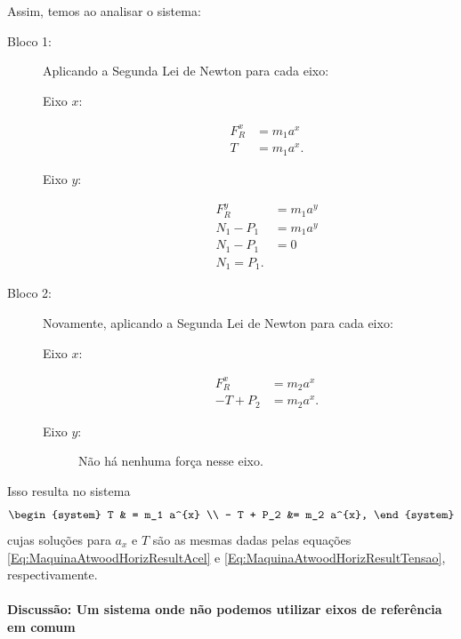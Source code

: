 Assim, temos ao analisar o sistema:
\begin{description}
    \item[Bloco 1:] Aplicando a Segunda Lei de Newton para cada eixo:
        \begin{description}
            \item[Eixo $x$:]
                \begin{align}
                    F_R^{x} &= m_1 a^{x} \\
                    T & = m_1 a^{x}.
                \end{align}
            \item[Eixo $y$:]
                \begin{align}
                    F_R^{y} &= m_1 a^{y} \\
                    N_1 - P_1 &= m_1 a^{y} \\
                    N_1 - P_1 &= 0 \\
                    N_1 = P_1.
                \end{align}
        \end{description}
    \item[Bloco 2:] Novamente, aplicando a Segunda Lei de Newton para cada eixo:
        \begin{description}
            \item[Eixo $x$:]
                \begin{align}
                    F_R^{x} &= m_2 a^{x} \\
                    - T + P_2 &= m_2 a^{x}.
                \end{align}
            \item[Eixo $y$:] Não há nenhuma força nesse eixo.
        \end{description}
\end{description}


\noindent{}Isso resulta no sistema
\begin{equation}
\begin{system}
    T & = m_1 a^{x} \\
    - T + P_2 &= m_2 a^{x},
\end{system}
\end{equation}
%
cujas soluções para $a_x$ e $T$ são as mesmas dadas pelas equações \eqref{Eq:MaquinaAtwoodHorizResultAcel} e \eqref{Eq:MaquinaAtwoodHorizResultTensao}, respectivamente.

\paragraph{Discussão: Um sistema onde não podemos utilizar eixos de referência em comum}


